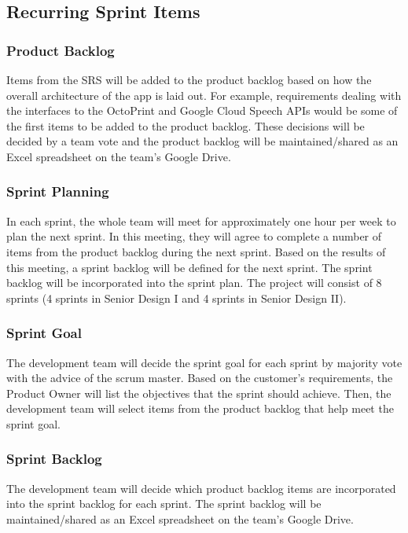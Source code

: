 \subsection{Recurring Sprint Items}

\subsubsection{Product Backlog}
Items from the SRS will be added to the product backlog based on how the overall architecture of the app is laid out. For example, requirements dealing with the interfaces to the OctoPrint and Google Cloud Speech APIs would be some of the first items to be added to the product backlog. These decisions will be decided by a team vote and the product backlog will be maintained/shared as an Excel spreadsheet on the team's Google Drive.

\subsubsection{Sprint Planning}
In each sprint, the whole team will meet for approximately one hour per week to plan the next sprint. In this meeting, they will agree to complete a number of items from the product backlog during the next sprint. Based on the results of this meeting, a sprint backlog will be defined for the next sprint. The sprint backlog will be incorporated into the sprint plan. The project will consist of 8 sprints (4 sprints in Senior Design I and 4 sprints in Senior Design II).

\subsubsection{Sprint Goal}
The development team will decide the sprint goal for each sprint by majority vote with the advice of the scrum master. Based on the customer's requirements, the Product Owner will list the objectives that the sprint should achieve. Then, the development team will select items from the product backlog that help meet the sprint goal. 

\subsubsection{Sprint Backlog}
The development team will decide which product backlog items are incorporated into the sprint backlog for each sprint. The sprint backlog will be maintained/shared as an Excel spreadsheet on the team's Google Drive. 

